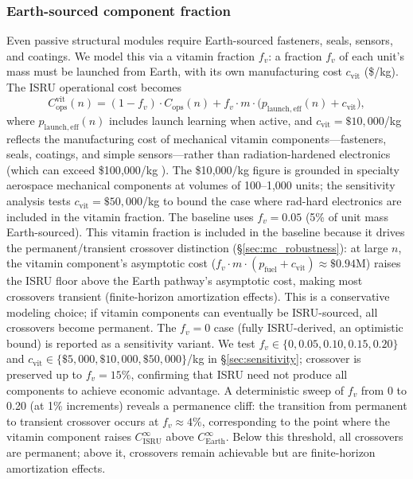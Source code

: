 \documentclass[preprint,12pt]{elsarticle}
\begin{document}
\subsubsection{Earth-sourced component fraction}
\label{sec:vitamin}

Even passive structural modules require Earth-sourced fasteners, seals, sensors, and coatings. We model this via a vitamin fraction $f_v$: a fraction $f_v$ of each unit's mass must be launched from Earth, with its own manufacturing cost $c_{\mathrm{vit}}$ (\$/kg). The ISRU operational cost becomes
\begin{equation}
  C_{\mathrm{ops}}^{\mathrm{vit}}(n) = (1 - f_v) \cdot C_{\mathrm{ops}}(n) + f_v \cdot m \cdot \bigl(p_{\mathrm{launch,eff}}(n) + c_{\mathrm{vit}}\bigr),
  \label{eq:vitamin}
\end{equation}
where $p_{\mathrm{launch,eff}}(n)$ includes launch learning when active, and $c_{\mathrm{vit}} = \$10{,}000$/kg reflects the manufacturing cost of mechanical vitamin components---fasteners, seals, coatings, and simple sensors---rather than radiation-hardened electronics (which can exceed \$100{,}000/kg \cite{wertz2011}). The \$10{,}000/kg figure is grounded in specialty aerospace mechanical components at volumes of 100--1{,}000 units; the sensitivity analysis tests $c_{\mathrm{vit}} = \$50{,}000$/kg to bound the case where rad-hard electronics are included in the vitamin fraction. The baseline uses $f_v = 0.05$ (5\% of unit mass Earth-sourced). This vitamin fraction is included in the baseline because it drives the permanent/transient crossover distinction (\S\ref{sec:mc_robustness}): at large $n$, the vitamin component's asymptotic cost ($f_v \cdot m \cdot (p_{\mathrm{fuel}} + c_{\mathrm{vit}}) \approx \$0.94$M) raises the ISRU floor above the Earth pathway's asymptotic cost, making most crossovers transient (finite-horizon amortization effects). This is a conservative modeling choice; if vitamin components can eventually be ISRU-sourced, all crossovers become permanent. The $f_v = 0$ case (fully ISRU-derived, an optimistic bound) is reported as a sensitivity variant. We test $f_v \in \{0, 0.05, 0.10, 0.15, 0.20\}$ and $c_{\mathrm{vit}} \in \{\$5{,}000, \$10{,}000, \$50{,}000\}$/kg in \S\ref{sec:sensitivity}; crossover is preserved up to $f_v = 15\%$, confirming that ISRU need not produce all components to achieve economic advantage. A deterministic sweep of $f_v$ from 0 to 0.20 (at 1\% increments) reveals a permanence cliff: the transition from permanent to transient crossover occurs at $f_v \approx 4\%$, corresponding to the point where the vitamin component raises $C_{\mathrm{ISRU}}^{\infty}$ above $C_{\mathrm{Earth}}^{\infty}$. Below this threshold, all crossovers are permanent; above it, crossovers remain achievable but are finite-horizon amortization effects.
\end{document}
